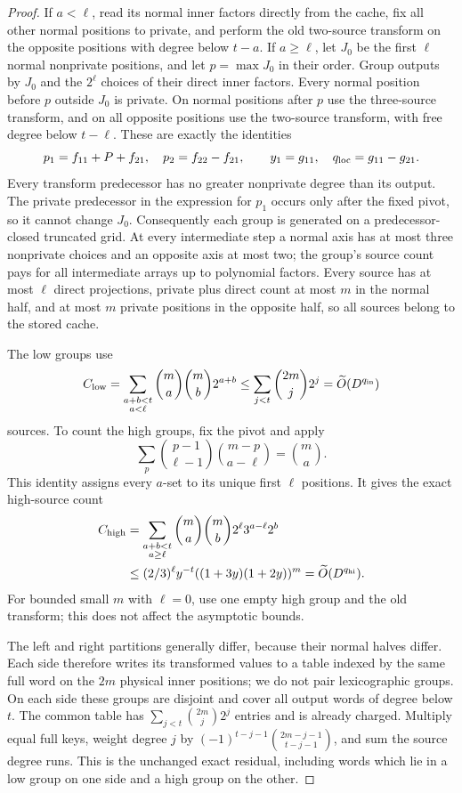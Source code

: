 \documentclass[11pt]{article}
\newcommand{\softO}{\widetilde O}
\begin{document}
\begin{proof}
If $a<\ell$, read its normal inner factors directly from the cache,
fix all other normal positions to private, and perform the old
two-source transform on the opposite positions with degree below $t-a$.
If $a\ge\ell$, let $J_0$ be the first $\ell$ normal nonprivate positions,
and let $p=\max J_0$ in their order. Group outputs by $J_0$ and the
$2^\ell$ choices of their direct inner factors. Every normal position
before $p$ outside $J_0$ is private. On normal positions after $p$ use
the three-source transform, and on all opposite positions use the
two-source transform, with free degree below $t-\ell$.
These are exactly the identities
\[
 p_1=f_{11}+P+f_{21},\quad p_2=f_{22}-f_{21},\qquad
 y_1=g_{11},\quad q_{\rm loc}=g_{11}-g_{21}.
\]
Every transform predecessor has no greater nonprivate degree than its
output. The private predecessor in the expression for $p_1$ occurs
only after the fixed pivot, so it cannot change $J_0$.
Consequently each group is generated on a predecessor-closed truncated
grid. At every intermediate step a normal axis has at most three
nonprivate choices and an opposite axis at most two; the group's
source count pays for all intermediate arrays up to polynomial factors.
Every source has at most $\ell$ direct projections, private plus direct
count at most $m$ in the normal half, and at most $m$ private positions
in the opposite half, so all sources belong to the stored cache.

The low groups use
\[
 C_{\rm low}=\sum_{\substack{a+b<t\\a<\ell}}
               \binom ma\binom mb2^{a+b}
 \le \sum_{j<t}\binom{2m}{j}2^j=\softO(D^{q_{\rm in}})
\]
sources. To count the high groups, fix the pivot and apply
\[
 \sum_p\binom{p-1}{\ell-1}\binom{m-p}{a-\ell}=\binom ma.
\]
This identity assigns every $a$-set to its unique first $\ell$ positions.
It gives the exact high-source count
\begin{align*}
 C_{\rm high}
 &=\sum_{\substack{a+b<t\\a\ge\ell}}
       \binom ma\binom mb2^\ell3^{a-\ell}2^b\\
 &\le(2/3)^\ell y^{-t}((1+3y)(1+2y))^m
   =\softO(D^{q_{\rm hi}}).
\end{align*}
For bounded small $m$ with $\ell=0$, use one empty high group and the
old transform; this does not affect the asymptotic bounds.

The left and right partitions generally differ, because their normal
halves differ. Each side therefore writes its transformed values to a
table indexed by the same full word on the $2m$ physical inner positions;
we do not pair lexicographic groups. On each side these groups are
disjoint and cover all output words of degree below $t$. The common
table has $\sum_{j<t}\binom{2m}{j}2^j$ entries and is already charged.
Multiply equal full keys, weight degree $j$ by
$(-1)^{t-j-1}\binom{2m-j-1}{t-j-1}$, and sum the source degree runs.
This is the unchanged exact residual, including words which lie in a
low group on one side and a high group on the other.


\end{proof}
\end{document}
